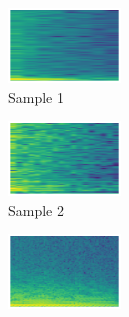 \begin{figure}[H]
{
    \begin{subfigure}{0.23\textwidth}
      \includegraphics[width=3cm]{titletune/buttons/samples/tune13.mod-1.wav-spec.png}%
      \caption*{Sample 1}
    \end{subfigure}
    \begin{subfigure}{0.23\textwidth}
      \includegraphics[width=3cm]{titletune/buttons/samples/tune13.mod-2.wav-spec.png}%
      \caption*{Sample 2}
    \end{subfigure}
    \begin{subfigure}{0.23\textwidth}
      \includegraphics[width=3cm]{titletune/buttons/samples/tune13.mod-4.wav-spec.png}%
\end{subfigure}}
\end{figure}
